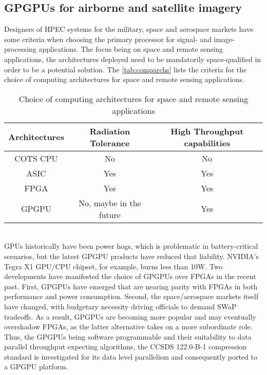 \subsection{GPGPUs for airborne and satellite imagery}
Designers of \gls{HPEC} systems for the military, space and aerospace markets have some criteria when choosing the primary processor for signal- and image-processing applications. The focus being on space and remote sensing applications, the architectures deployed need to be mandatorily space-qualified in order to be a potential solution. The \autoref{tab:comparchs} lists the criteria for the choice of computing architectures for space and remote sensing applications. 
\\
\begin{table}[h]
\begin{tabular}{@{}ccc@{}}
\toprule
Architectures & Radiation Tolerance     & High Throughput capabilities \\ \midrule
COTS CPU      & No                      & No                           \\
ASIC          & Yes                     & Yes                          \\
FPGA          & Yes                     & Yes                          \\
GPGPU         & No, maybe in the future & Yes                          \\ \bottomrule
\end{tabular}
\caption{Choice of computing architectures for space and remote sensing applications}\label{tab:comparchs}
\end{table}
\\
\glspl{GPU} historically have been power hogs, which is problematic in battery-critical scenarios, but the latest \gls{GPGPU} products have reduced that liability. NVIDIA's Tegra X1 \gls{GPU}/\gls{CPU} chipset, for example, burns less than 10W. Two developments have manifested the choice of \glspl{GPGPU} over \glspl{FPGA} in the recent past. First, \glspl{GPGPU} have emerged that are nearing parity with \glspl{FPGA} in both performance and power consumption. Second, the space/aerospace markets itself have changed, with budgetary necessity driving officials to demand \gls{SWaP} tradeoffs. As a result, \glspl{GPGPU} are becoming more popular and may eventually overshadow \glspl{FPGA}, as the latter alternative takes on a more subordinate role. Thus, the \glspl{GPGPU} being software programmable and their suitability to data parallel throughput expecting algorithms, the \gls{CCSDS} 122.0-B-1 compression standard is investigated for its data level parallelism and consequently ported to a \gls{GPGPU} platform.


